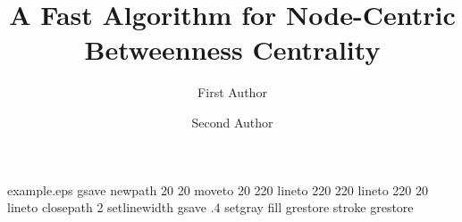 %
%
%
%
%
\begin{filecontents*}{example.eps}
gsave
newpath
  20 20 moveto
  20 220 lineto
  220 220 lineto
  220 20 lineto
closepath
2 setlinewidth
gsave
  .4 setgray fill
grestore
stroke
grestore
\end{filecontents*}
%
\RequirePackage{fix-cm}
%
\documentclass[smallextended,natbib]{svjour3}       %
%
\smartqed  %
%
\usepackage{graphicx}
%
%
%
%
%


\title{A Fast Algorithm for Node-Centric Betweenness Centrality%
}


\author{First Author         \and
        Second Author %
}



